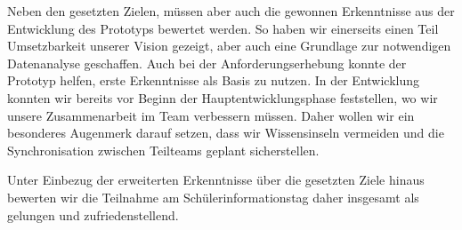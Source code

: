 Neben den gesetzten Zielen, müssen aber auch die gewonnen Erkenntnisse aus der Entwicklung des Prototyps bewertet werden.
So haben wir einerseits einen Teil Umsetzbarkeit unserer Vision gezeigt, aber auch eine Grundlage zur notwendigen Datenanalyse geschaffen.
Auch bei der Anforderungserhebung konnte der Prototyp helfen, erste Erkenntnisse als Basis zu nutzen.
In der Entwicklung konnten wir bereits vor Beginn der Hauptentwicklungsphase feststellen, wo wir unsere Zusammenarbeit im Team verbessern müssen.
Daher wollen wir ein besonderes Augenmerk darauf setzen, dass wir Wissensinseln vermeiden und die Synchronisation zwischen Teilteams geplant sicherstellen.

Unter Einbezug der erweiterten Erkenntnisse über die gesetzten Ziele hinaus bewerten wir die Teilnahme am Schülerinformationstag daher insgesamt als gelungen und zufriedenstellend.
